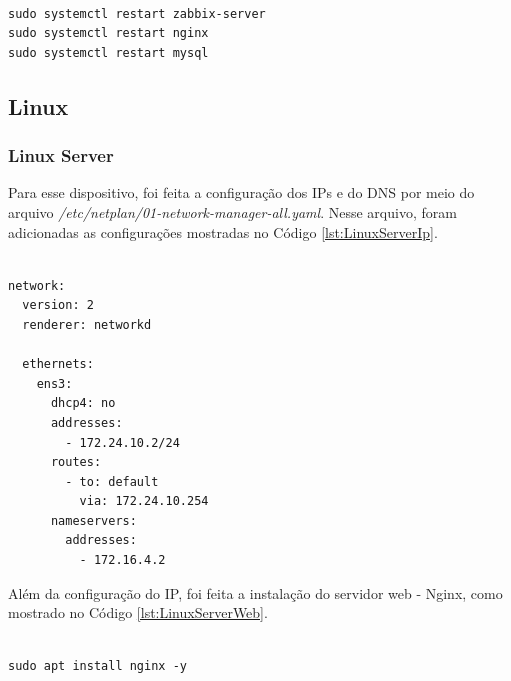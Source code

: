 \begin{listing}[H]
\centering
\begin{verbatim}

sudo systemctl restart zabbix-server
sudo systemctl restart nginx
sudo systemctl restart mysql

\end{verbatim}
\caption{Reinicialização dos serviços do servidor Zabbix}
\label{lst:ZabbixRestart}
\end{listing}

\subsection{Linux}

\subsubsection{Linux Server}
Para esse dispositivo, foi feita a configuração dos IPs e do DNS por meio do arquivo \textit{/etc/netplan/01-network-manager-all.yaml}. Nesse arquivo, foram adicionadas as configurações mostradas no Código \ref{lst:LinuxServerIp}.

\begin{listing}[H]
\centering
\begin{verbatim}

network:
  version: 2
  renderer: networkd

  ethernets:
    ens3:
      dhcp4: no
      addresses:
        - 172.24.10.2/24
      routes:
        - to: default
          via: 172.24.10.254
      nameservers:
        addresses:
          - 172.16.4.2

\end{verbatim}
\caption{Configuração do IP - Linux Server}
\label{lst:LinuxServerIp}
\end{listing}

Além da configuração do IP, foi feita a instalação do servidor web - Nginx, como mostrado no Código \ref{lst:LinuxServerWeb}.

\begin{listing}[H]
\centering
\begin{verbatim}

sudo apt install nginx -y

\end{verbatim}
\caption{Instalação do servidor web - Linux Server}
\label{lst:LinuxServerWeb}
\end{listing}

